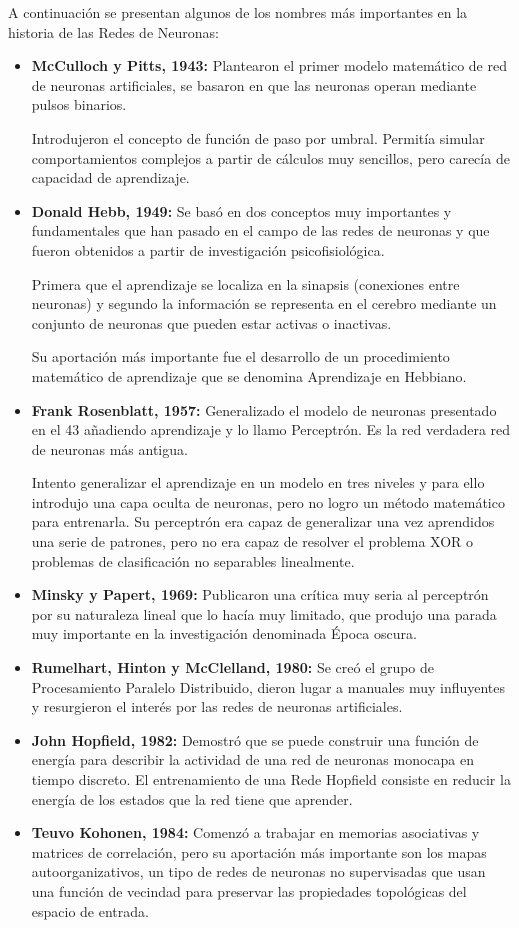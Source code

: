 \documentclass[12pt, twoside, openright]{report} %
\begin{document}
A continuación se presentan algunos de los nombres más importantes en la historia de las Redes de Neuronas:
\begin{itemize}
	\item \textbf{McCulloch y Pitts, 1943:} Plantearon el primer modelo matemático de red de neuronas artificiales, se basaron en que las neuronas operan mediante pulsos binarios.

	      Introdujeron el concepto de función de paso por umbral. Permitía simular comportamientos complejos a partir de cálculos muy sencillos, pero carecía de capacidad de aprendizaje.
	\item \textbf{Donald Hebb, 1949:} Se basó en dos conceptos muy importantes y fundamentales que han pasado en el campo de las redes de neuronas y que fueron obtenidos a partir de investigación psicofisiológica.

	      Primera que el aprendizaje se localiza en la sinapsis (conexiones entre neuronas) y segundo la información se representa en el cerebro mediante un conjunto de neuronas que pueden estar activas o inactivas.

	      Su aportación más importante fue el desarrollo de un procedimiento matemático de aprendizaje que se denomina Aprendizaje en Hebbiano.
	\item \textbf{Frank Rosenblatt, 1957:} Generalizado el modelo de neuronas presentado en el 43 añadiendo aprendizaje y lo llamo Perceptrón. Es la red verdadera red de neuronas más antigua.

	      Intento generalizar el aprendizaje en un modelo en tres niveles y para ello introdujo una capa oculta de neuronas, pero no logro un método matemático para entrenarla. Su perceptrón era capaz de generalizar una vez aprendidos una serie de patrones, pero no era capaz de resolver el problema XOR o problemas de clasificación no separables linealmente.
	\item \textbf{Minsky y Papert, 1969:} Publicaron una crítica muy seria al perceptrón por su naturaleza lineal que lo hacía muy limitado, que produjo una parada muy importante en la investigación denominada Época oscura.
	\item \textbf{Rumelhart, Hinton y McClelland, 1980:} Se creó el grupo de Procesamiento Paralelo Distribuido, dieron lugar a manuales muy influyentes y resurgieron el interés por las redes de neuronas artificiales.
	\item \textbf{John Hopfield, 1982:} Demostró que se puede construir una función de energía para describir la actividad de una red de neuronas monocapa en tiempo discreto. El entrenamiento de una Rede Hopfield consiste en reducir la energía de los estados que la red tiene que aprender.
	\item \textbf{Teuvo Kohonen, 1984:} Comenzó a trabajar en memorias asociativas y matrices de correlación, pero su aportación más importante son los mapas autoorganizativos, un tipo de redes de neuronas no supervisadas que usan una función de vecindad para preservar las propiedades topológicas del espacio de entrada.


\end{itemize}
\end{document}
